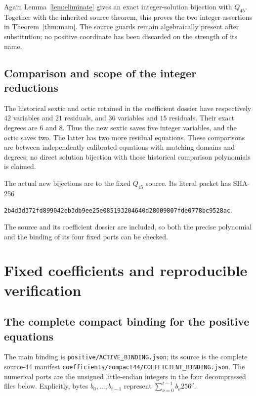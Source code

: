 \documentclass[11pt,a4paper]{article}
\theoremstyle{definition}
\theoremstyle{remark}
\newcommand{\sourcepath}[1]{\texttt{\small #1}}
\begin{document}
Again Lemma~\ref{lem:eliminate} gives an exact integer-solution bijection
with \(Q_{45}\). Together with the inherited source theorem, this proves
the two integer assertions in Theorem~\ref{thm:main}. The source guards
remain algebraically present after substitution; no positive coordinate
has been discarded on the strength of its name.

\subsection{Comparison and scope of the integer reductions}

The historical sextic and octic retained in the coefficient dossier
have respectively \(42\) variables and \(21\) residuals, and \(36\)
variables and \(15\) residuals. Their exact degrees are \(6\) and \(8\).
Thus the new sextic saves five integer variables, and the octic saves
two. The latter has two more residual equations. These comparisons are
between independently calibrated equations with matching domains and
degrees; no direct solution bijection with those historical comparison
polynomials is claimed.

The actual new bijections are to the fixed \(Q_{45}\) source. Its literal
packet has SHA-256
\begin{center}
\scriptsize\texttt{2b4d3d372fd899042eb3db9ee25e085193204640d28009807fde0778bc9528ac}.
\end{center}
The source and its coefficient dossier are included, so both the precise
polynomial and the binding of its four fixed ports can be checked.

\section{Fixed coefficients and reproducible verification}
\label{sec:binding}

\subsection{The complete compact binding for the positive equations}

The main binding is \sourcepath{positive/ACTIVE\_BINDING.json}; its source
is the complete source-44 manifest
\sourcepath{coefficients/compact44/COEFFICIENT\_BINDING.json}.
The numerical ports are the unsigned little-endian integers in the four
decompressed files below. Explicitly, bytes \(b_0,\ldots,b_{t-1}\)
represent \(\sum_{\nu=0}^{t-1}b_\nu256^\nu\).
\end{document}
